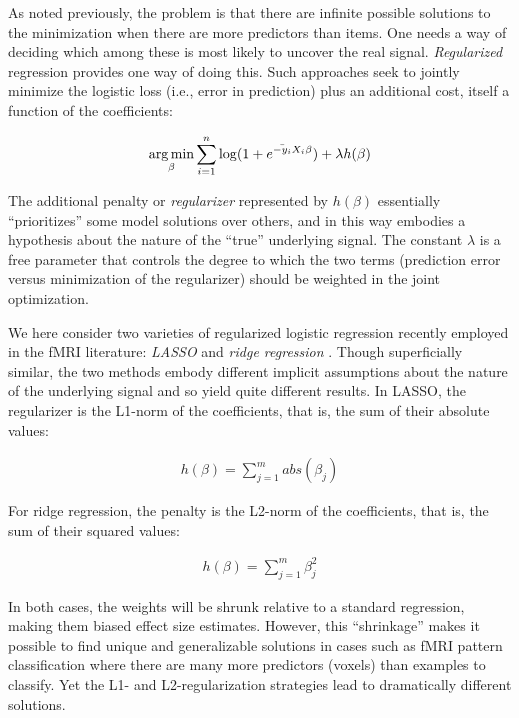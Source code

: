 As noted previously, the problem is that there are infinite possible solutions to the minimization when there are more predictors than items. One needs a way of deciding which among these is most likely to uncover the real signal. {\em Regularized} regression provides one way of doing this. Such approaches seek to jointly minimize the logistic loss (i.e., error in prediction) plus an additional cost, itself a function of the coefficients:

\begin{align}
\operatorname*{arg\,min}_\beta \sum^{n}_{i=1}{\log(1 + e^{\bar{-y_i} X_i\beta})} + \lambda h(\beta)
\label{eq.regularized}
\end{align}

The additional penalty or {\em regularizer} represented by $h(\beta)$ essentially ``prioritizes'' some model solutions over others, and in this way embodies a hypothesis about the nature of the ``true'' underlying signal. The constant $\lambda$ is a free parameter that controls the degree to which the two terms (prediction error versus minimization of the regularizer) should be weighted in the joint optimization.

We here consider two varieties of regularized logistic regression recently employed in the fMRI literature: {\em LASSO} and {\em ridge regression} \cite{riggall_relationship_2012,rish_sparse_2012}. Though superficially similar, the two methods embody different implicit assumptions about the nature of the underlying signal and so yield quite different results. In LASSO, the regularizer is the L1-norm of the coefficients, that is, the sum of their absolute values:

\begin{align}
h(\beta) = \sum^m_{j=1} abs(\beta_j)
\label{eq.lasso}
\end{align}

For ridge regression, the penalty is the L2-norm of the coefficients, that is, the sum of their squared values:

\begin{align}
h(\beta) = \sum^m_{j=1}\beta_j^2
\label{eq.ridge}
\end{align}

In both cases, the weights will be shrunk relative to a standard regression, making them biased effect size estimates. However, this ``shrinkage'' makes it possible to find unique and generalizable solutions in cases such as fMRI pattern classification where there are many more predictors (voxels) than examples to classify. Yet the L1- and L2-regularization strategies lead to dramatically different solutions.

